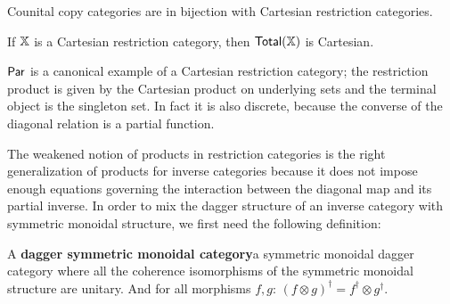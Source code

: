 \begin{theorem}\cite[Thm. 5.2]{restiii}
Counital copy categories are in bijection with Cartesian restriction categories.
\end{theorem}


\begin{proposition} 
\label{prop:cartesian}
If $\mathbb{X}$ is a  Cartesian restriction category, then $\mathsf{Total}(\mathbb{X})$ is Cartesian.
\end{proposition}



$\mathsf{Par}$ is a canonical example of a Cartesian restriction category; the restriction product is given by the Cartesian product on underlying sets and the terminal object is  the singleton set. In fact it is also discrete, because the converse of the diagonal relation is a partial function.




The weakened notion of products in restriction categories is the right generalization of products for inverse categories because it does not impose enough equations governing the interaction between the diagonal map and its partial inverse.  In order to mix the dagger structure of an inverse category with symmetric monoidal structure, we first need the following definition:


\begin{definition}
A {\bf dagger symmetric monoidal  category}a symmetric monoidal dagger category where all the coherence isomorphisms of the symmetric monoidal structure are unitary. And for all morphisms $f,g$: $(f \otimes g)^\dag = f^\dag \otimes g^\dag$.
\end{definition}


